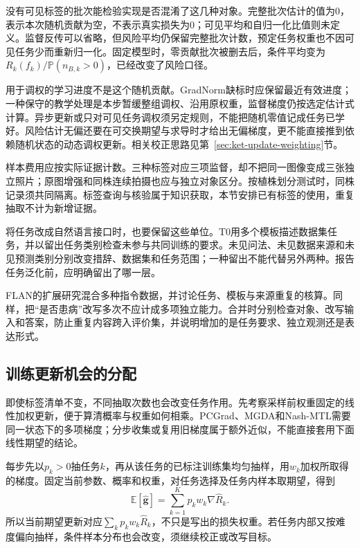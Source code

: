 没有可见标签的批次能检验实现是否混淆了这几种对象。完整批次估计的值为0，表示本次随机贡献为空，不表示真实损失为0；可见平均和自归一化比值则未定义。监督反传可以省略，但风险平均仍保留完整批次计数，预定任务权重也不因可见任务少而重新归一化。固定模型时，零贡献批次被删去后，条件平均变为$R_k(f_k)/\mathbb P(n_{B,k}>0)$，已经改变了风险口径。

用于调权的学习进度不是这个随机贡献。GradNorm缺标时应保留最近有效进度；一种保守的教学处理是本步暂缓整组调权、沿用原权重，监督梯度仍按选定估计式计算。异步更新或只对可见任务调权须另定规则，不能把随机零值记成任务已学好。风险估计无偏还要在可交换期望与求导时才给出无偏梯度，更不能直接推到依赖随机状态的动态调权更新。相关校正思路见第~\ref{sec:ket-update-weighting}节。

样本费用应按实际证据计数。三种标签对应三项监督，却不把同一图像变成三张独立照片；原图增强和同株连续拍摄也应与独立对象区分。按植株划分测试时，同株记录须共同隔离。标签查询与核验属于知识获取，本节安排已有标签的使用，重复抽取不计为新增证据。

将任务改成自然语言接口时，也要保留这些单位。T0用多个模板描述数据集任务，并以留出任务类别检查未参与共同训练的要求。未见问法、未见数据来源和未见预测类别分别改变措辞、数据集和任务范围；一种留出不能代替另外两种。报告任务泛化前，应明确留出了哪一层。

FLAN的扩展研究混合多种指令数据，并讨论任务、模板与来源重复的核算。同样，把“是否患病”改写多次不应计成多项独立能力。合并时分别检查对象、改写输入和答案，防止重复内容跨入评价集，并说明增加的是任务要求、独立观测还是表达形式。

\subsection{训练更新机会的分配}
\label{sec:ket-sharing-sampling}

即使标签清单不变，不同抽取次数也会改变任务作用。先考察采样前权重固定的线性加权更新，便于算清概率与权重如何相乘。PCGrad、MGDA和Nash-MTL需要同一状态下的多项梯度；分步收集或复用旧梯度属于额外近似，不能直接套用下面线性期望的结论。

每步先以$p_k>0$抽任务$k$，再从该任务的已标注训练集均匀抽样，用$w_k$加权所取得的梯度。固定当前参数、概率和权重，对任务选择及任务内样本取期望，得到
\begin{equation}
  \mathbb E[\widehat{\bm g}]
  =\sum_{k=1}^{K}p_kw_k
    \nabla\hat R_k.
  \label{eq:ket-sharing-effective-objective}
\end{equation}
所以当前期望更新对应$\sum_kp_kw_k\hat R_k$，不只是写出的损失权重。若任务内部又按难度偏向抽样，条件样本分布也会改变，须继续校正或改写目标。

